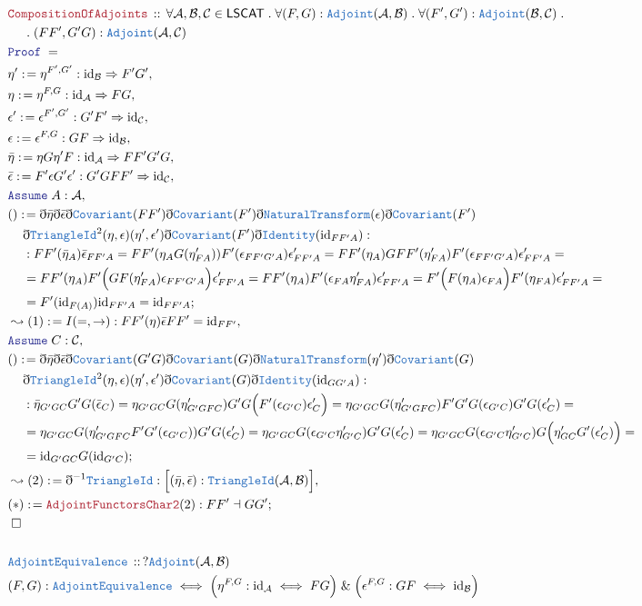 \documentclass[12pt]{scrartcl}
\newcommand{\TYPE}[1]{\textcolor{NavyBlue}{\mathtt{#1}}}
\newcommand{\LOGIC}[1]{\textcolor{Blue}{\mathtt{#1}}}
\newcommand{\THM}[1]{\textcolor{Maroon}{\mathtt{#1}}}
\renewcommand{\.}{\; . \;}
\newcommand{\de}{: \kern 0.1pc =}
\newcommand{\Theorem}[2]{& \THM{#1} \, :: \, #2 \\ & \Proof = \\ }
\newcommand{\DeclareType}[2]{& \TYPE{#1} \, :: \, #2 \\}
\newcommand{\DefineType}[3]{& #1 : \TYPE{#2} \iff #3 \\}
\newcommand{\NewLine}{\\ & \kern 1pc}
\newcommand{\Page}[1]{ \begin{align*} #1 \end{align*}   }
\newcommand{ \bd }{ \ByDef }
\renewcommand{\And}{\; \& \;}
\DeclareMathOperator*{\id}{id}
\newcommand{\Say}[3]{& #1 \de #2 : #3, \\}
\newcommand{\Conclude}[3]{& #1 \de #2 : #3; \\}
\newcommand{\Derive}[3]{& \leadsto #1 \de #2 : #3, \\}
\newcommand{\Assume}[2]{& \LOGIC{Assume} \; #1 : #2, \\}
\newcommand{\QED}{\; \square}
\newcommand{\EndProof}{& \QED \\}
\newcommand{\ByDef}{\eth}
\newcommand{\Proof}{\LOGIC{Proof} \; }
\newcommand{\Cov}{\TYPE{Covariant}}
\newcommand{\NT}{\TYPE{NaturalTransform}}
\newcommand{\C}{\mathcal{C}}
\newcommand{\A}{\mathcal{A}}
\newcommand{\B}{\mathcal{B}}
\begin{document}
\Page{
	\Theorem{CompositionOfAdjoints}{ 
		\forall \A,\B,\C \in \mathsf{LSCAT} \.  
		\forall (F,G) : \TYPE{Adjoint}(\A,\B) \.
		\forall (F',G') : \TYPE{Adjoint}(\B,\C) \. \NewLine \.
		(FF',G'G) : \TYPE{Adjoint}(\A,\C)
	}
	\Say{ \eta' }{ \eta^{F',G'}   }{ {\id}_\B \Rightarrow F'G'  }
	\Say{ \eta  }{\eta^{F,G}}{  {\id}_\A \Rightarrow FG }
	\Say{ \epsilon' }{ \epsilon^{F',G'}  }{  G'F' \Rightarrow  {\id}_\C  }
	\Say{ \epsilon }{ \epsilon^{F,G} }{  GF \Rightarrow {\id}_\B   }
	\Say{ \bar \eta }{   \eta G \eta' F }{ {\id}_\A \Rightarrow  FF'G'G  }
	\Say{ \bar \epsilon }{  F' \epsilon G' \epsilon'  }{ G'GFF' \Rightarrow {\id}_\C  }
	\Assume{  A  }{ \A  }
	\Conclude{()}
	{
		\bd \bar \eta \bd \bar \epsilon 
		\bd \Cov( FF')
		\bd \Cov( F' )
		\bd \NT(\epsilon)
		\bd \Cov( F') \NewLine
		\bd \TYPE{TriangleId}^2(\eta,\epsilon)(\eta',\epsilon')
		\bd \Cov( F' ) \bd \TYPE{Identity}({\id}_{FF'A})
	}
	{   
		\NewLine  :
		FF'(\bar \eta_A)\bar \epsilon_{FF' A} = 	
		FF'( \eta_A G(\eta'_{FA})) F'(\epsilon_{FF'G'A}) \epsilon'_{FF'A}   =
		FF'(\eta_A) GFF'(\eta'_{FA}) F'(\epsilon_{FF'G'A}) \epsilon'_{FF'A} = \NewLine =
		FF'(\eta_A)F'\Big( GF(\eta'_{FA})\epsilon_{FF'G'A}\Big) \epsilon'_{FF'A} =
		FF'(\eta_A)F' ( \epsilon_{FA} \eta'_{FA} ) \epsilon'_{FF'A} = 
		F'\Big( F(\eta_A)\epsilon_{FA} \Big) F'(\eta_{FA})\epsilon'_{FF'A} = \NewLine =  
		F'({\id}_{F(A)}){\id}_{FF'A} = 
		{\id}_{FF'A} 
	}
	\Derive{(1)}{I(=,\to)}{ FF'(\eta) \bar \epsilon FF' = {\id}_{FF'} }
	\Assume{ C }{\C}
	\Conclude{()}
	{
		\bd \bar \eta \bd \bar \epsilon 
		\bd \Cov( G'G)
		\bd \Cov( G )
		\bd \NT(\eta')
		\bd \Cov( G ) \NewLine
		\bd \TYPE{TriangleId}^2(\eta,\epsilon)(\eta',\epsilon')
		\bd \Cov( G ) \bd \TYPE{Identity}({\id}_{GG'A})	
	}
	{
		\NewLine :
                \bar \eta_{G'GC} G'G(  \bar \epsilon_{C} ) =
		\eta_{G'GC}G(\eta'_{G'GFC}) G'G\Big(  F'(\epsilon_{G'C}) \epsilon'_{C} \Big) =
		\eta_{G'GC}G(\eta'_{G'GFC}) F'G'G(\epsilon_{G'C})G'G(\epsilon'_{C}) =  \NewLine =
		\eta_{G'GC}G(\eta'_{G'GFC} F'G'(\epsilon_{G'C}) )G'G(\epsilon'_{C}) =
		\eta_{G'GC}G( \epsilon_{G'C} \eta'_{G'C} ) G'G(\epsilon'_{C}) =
		\eta_{G'GC}G(\epsilon_{G'C}\eta'_{G'C})G\Big(\eta'_{GC}G'(\epsilon'_{C})\Big) = \NewLine =
		{\id}_{G'GC} G( {\id}_{G'C} )
	}
	\Derive{(2) }{\bd^{-1}\TYPE{TriangleId} }{\Big[ (\bar \eta, \bar \epsilon) : \TYPE{TriangleId}(\A,\B)  \Big] }
	\Conclude{(*)}{\THM{AdjointFunctorsChar2}(2)}{ FF' \dashv GG' }
	\EndProof
	\\
	\DeclareType{AdjointEquivalence}{?\TYPE{Adjoint}(\A,\B)}
	\DefineType{(F,G)}{AdjointEquivalence}{ \Big(\eta^{F,G} : {\id}_{\A} \iff FG\Big) 
		\And \Big(\epsilon^{F,G} : GF \iff {\id}_{\B}\Big)}
}
\end{document}
